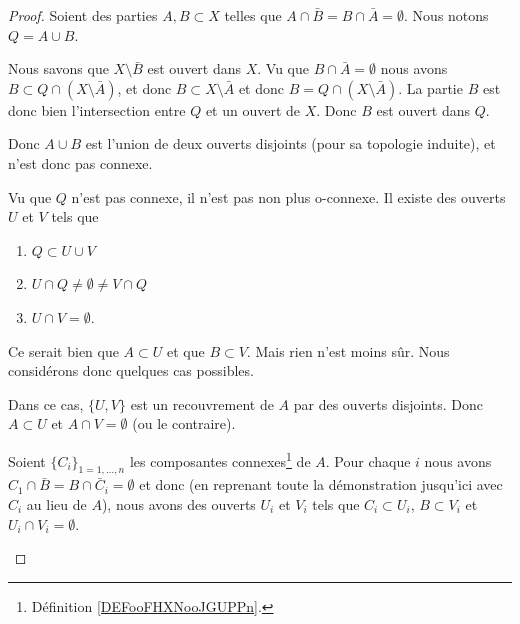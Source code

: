 \begin{proof}
	Soient des parties \( A,B\subset X\)  telles que \( A\cap\bar B=B\cap\bar A=\emptyset\). Nous notons \( Q=A\cup B\).
	\begin{subproof}
		\spitem[\( B\) est ouvert dans \(Q= A\cup B\)]
		Nous savons que \( X\setminus \bar B\) est ouvert dans \( X\). Vu que \( B\cap\bar A=\emptyset\) nous avons \( B\subset Q\cap(X\setminus\bar A)\), et donc \( B\subset X\setminus \bar A\) et donc \( B=Q\cap(X\setminus \bar A)\). La partie \( B\) est donc bien l'intersection entre \( Q\) et un ouvert de \( X\). Donc \( B\) est ouvert dans \( Q\).

		Donc \( A\cup B\) est l'union de deux ouverts disjoints (pour sa topologie induite), et n'est donc pas connexe.

		Vu que \( Q\) n'est pas connexe, il n'est pas non plus o-connexe. Il existe des ouverts \( U\) et \( V\) tels que
		\begin{enumerate}
			\item
			      \( Q\subset U\cup V\)
			\item
			      \( U\cap Q\neq\emptyset\neq V\cap Q\)
			\item
			      \( U\cap V=\emptyset\).
		\end{enumerate}

		Ce serait bien que \( A\subset U\) et que \( B\subset V\). Mais rien n'est moins sûr. Nous considérons donc quelques cas possibles.

		Dans ce cas, \( \{ U,V \}\) est un recouvrement de \( A\) par des ouverts disjoints. Donc \( A\subset U\) et \( A\cap V=\emptyset\) (ou le contraire).

		Soient \( \{ C_i \}_{1=1,\ldots,n}\) les composantes connexes\footnote{Définition \ref{DEFooFHXNooJGUPPn}.} de \( A\). Pour chaque \( i\) nous avons \( C_1\cap\bar B=B\cap\bar C_i=\emptyset\) et donc (en reprenant toute la démonstration jusqu'ici avec \( C_i\) au lieu de \( A\)), nous avons des ouverts \( U_i\) et \( V_i\) tels que \( C_i\subset U_i\), \( B\subset V_i\) et \( U_i\cap V_i= \emptyset\). %


\end{subproof}
\end{proof}
